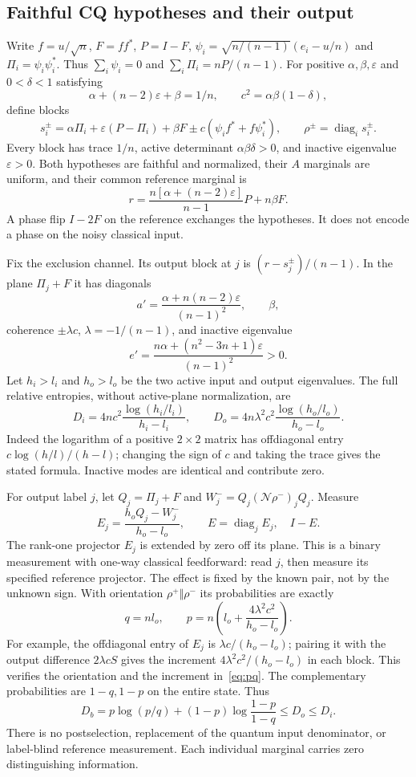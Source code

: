 \documentclass[11pt]{article}
\theoremstyle{remark}\newtheorem{remark}[theorem]{Remark}
\newcommand{\diag}{\operatorname{diag}}
\newcommand{\N}{\mathcal N}
\newcommand{\eps}{\varepsilon}
\begin{document}
\subsection{Faithful CQ hypotheses and their output}
Write $f=u/\sqrt n$, $F=ff^*$, $P=I-F$,
$\psi_i=\sqrt{n/(n-1)}(e_i-u/n)$ and $\Pi_i=\psi_i\psi_i^*$. Thus $\sum_i\psi_i=0$ and $\sum_i\Pi_i=nP/(n-1)$. For positive $\alpha,\beta,\eps$ and $0<\delta<1$ satisfying
\[
 \alpha+(n-2)\eps+\beta=1/n,
 \qquad c^2=\alpha\beta(1-\delta),
\]
define blocks
\begin{equation}\label{eq:blocks}
 s_i^\pm=\alpha\Pi_i+\eps(P-\Pi_i)+\beta F
 \pm c(\psi_if^*+f\psi_i^*),\qquad \rho^\pm=\diag_i s_i^\pm.
\end{equation}
Every block has trace $1/n$, active determinant $\alpha\beta\delta>0$, and inactive eigenvalue $\eps>0$. Both hypotheses are faithful and normalized, their $A$ marginals are uniform, and their common reference marginal is
\[
 r=\frac{n[\alpha+(n-2)\eps]}{n-1}P+n\beta F.
\]
A phase flip $I-2F$ on the reference exchanges the hypotheses. It does not encode a phase on the noisy classical input.

Fix the exclusion channel. Its output block at $j$ is $(r-s_j^\pm)/(n-1)$. In the plane $\Pi_j+F$ it has diagonals
\[
 a'=\frac{\alpha+n(n-2)\eps}{(n-1)^2},\qquad\beta,
\]
coherence $\pm\lambda c$, $\lambda=-1/(n-1)$, and inactive eigenvalue
\[
 e'=\frac{n\alpha+(n^2-3n+1)\eps}{(n-1)^2}>0.
\]
Let $h_i>l_i$ and $h_o>l_o$ be the two active input and output eigenvalues. The full relative entropies, without active-plane normalization, are
\begin{equation}\label{eq:finiteD}
 D_i=4nc^2\frac{\log(h_i/l_i)}{h_i-l_i},\qquad
 D_o=4n\lambda^2c^2\frac{\log(h_o/l_o)}{h_o-l_o}.
\end{equation}
Indeed the logarithm of a positive $2\times2$ matrix has offdiagonal entry $c\log(h/l)/(h-l)$; changing the sign of $c$ and taking the trace gives the stated formula. Inactive modes are identical and contribute zero.

For output label $j$, let $Q_j=\Pi_j+F$ and $W_j^-=Q_j(\N\rho^-)_{j}Q_j$. Measure
\[
 E_j=\frac{h_oQ_j-W_j^-}{h_o-l_o},\qquad
 E=\diag_jE_j,\quad I-E.
\]
The rank-one projector $E_j$ is extended by zero off its plane. This is a binary measurement with one-way classical feedforward: read $j$, then measure its specified reference projector. The effect is fixed by the known pair, not by the unknown sign. With orientation $\rho^+\Vert\rho^-$ its probabilities are exactly
\begin{equation}\label{eq:pq}
 q=nl_o,\qquad p=n\left(l_o+\frac{4\lambda^2c^2}{h_o-l_o}\right).
\end{equation}
For example, the offdiagonal entry of $E_j$ is $\lambda c/(h_o-l_o)$; pairing it with the output difference $2\lambda cS$ gives the increment $4\lambda^2c^2/(h_o-l_o)$ in each block. This verifies the orientation and the increment in~\eqref{eq:pq}. The complementary probabilities are $1-q,1-p$ on the entire state. Thus
\[
 D_b=p\log(p/q)+(1-p)\log\frac{1-p}{1-q}\leq D_o\leq D_i.
\]
There is no postselection, replacement of the quantum input denominator, or label-blind reference measurement. Each individual marginal carries zero distinguishing information.
\end{document}
